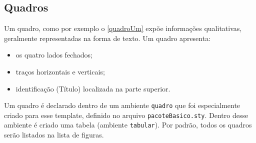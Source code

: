 \documentclass[
  12pt,		%
  a4paper,	%
  openright,%
  oneside,	%
  chapter=TITLE,		%
  section=TITLE,		%
  english,	%
  french,	%
  spanish,	%
  brazil	%
]{abntex2}
\begin{document}
            \subsection {Quadros}
                
                Um quadro, como por exemplo o \ref{quadroUm} expõe informações qualitativas, geralmente representadas na forma de texto. Um quadro apresenta:
                
                \begin{itemize}
                    \item os quatro lados fechados;
                    \item traços horizontais e verticais;
                    \item identificação (Título) localizada na parte superior.
                \end{itemize}
                
                Um quadro é declarado dentro de um ambiente \verb|quadro| que foi especialmente criado para esse template, definido no arquivo \verb|pacoteBasico.sty|. Dentro desse ambiente é criado uma tabela (ambiente \verb|tabular|). Por padrão, todos os quadros serão listados na lista de figuras.
\end{document}
